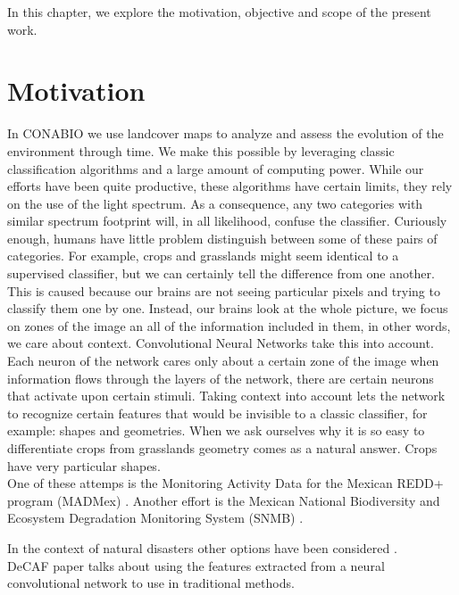 In this chapter, we explore the motivation, objective and scope of the present work.\\


\section{Motivation}

In CONABIO we use landcover maps to analyze and assess the evolution of the environment through time. We make this possible by leveraging classic classification algorithms and a large amount of computing power. While our efforts have been quite productive, these algorithms have certain limits, they rely on the use of the light spectrum. As a consequence, any two categories with similar spectrum footprint will, in all likelihood, confuse the classifier. Curiously enough, humans have little problem distinguish between some of these pairs of categories. For example, crops and grasslands might seem identical to a supervised classifier, but we can certainly tell the difference from one another. This is caused because our brains are not seeing particular pixels and trying to classify them one by one. Instead, our brains look at the whole picture, we focus on zones of the image an all of the information included in them, in other words, we care about context. Convolutional Neural Networks take this into account. Each neuron of the network cares only about a certain zone of the image when information flows through the layers of the network, there are certain neurons that activate upon certain stimuli. Taking context into account lets the network to recognize certain features that would be invisible to a classic classifier, for example: shapes and geometries. When we ask ourselves why it is so easy to differentiate crops from grasslands geometry comes as a natural answer. Crops have very particular shapes.\\

One of these attemps is the Monitoring Activity Data for the Mexican REDD+ program (MADMex) \cite{rs6053923}. Another effort is the Mexican National Biodiversity and Ecosystem Degradation Monitoring System (SNMB) \cite{GARCIAALANIZ201762}. 


In the context of natural disasters other options have been considered \cite{Kryvasheyeue1500779}.\\

DeCAF paper talks about using the features extracted from a neural convolutional network to use in traditional methods. \cite{DBLP:journals/corr/DonahueJVHZTD13}\\

